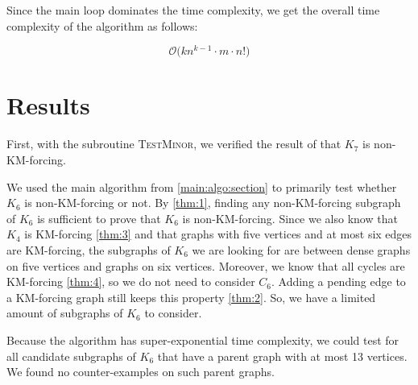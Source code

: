 Since the main loop dominates the time complexity, we get the overall time complexity of the algorithm as follows:

\[
    \mathcal{O}\bigl(kn^{k-1} \cdot m \cdot n!\bigr)
\]

\section{Results}

First, with the subroutine \textsc{TestMinor}, we verified the result of \cite{matthias_2022} that $K_7$ is non-KM-forcing.

We used the main algorithm from \ref{main:algo:section} to primarily test whether $K_6$ is non-KM-forcing or not.  
By \ref{thm:1}, finding any non-KM-forcing subgraph of $K_6$ is sufficient to prove that $K_6$ is non-KM-forcing.  
Since we also know that $K_4$ is KM-forcing \ref{thm:3} and that graphs with five vertices and at most six edges are KM-forcing,  
the subgraphs of $K_6$ we are looking for are between dense graphs on five vertices and graphs on six vertices.  
Moreover, we know that all cycles are KM-forcing \ref{thm:4}, so we do not need to consider $C_6$.  
Adding a pending edge to a KM-forcing graph still keeps this property \ref{thm:2}.  
So, we have a limited amount of subgraphs of $K_6$ to consider.

Because the algorithm has super-exponential time complexity, we could test for all candidate subgraphs of $K_6$ that have a parent 
graph with at most 13 vertices. 
We found no counter-examples on such parent graphs.

